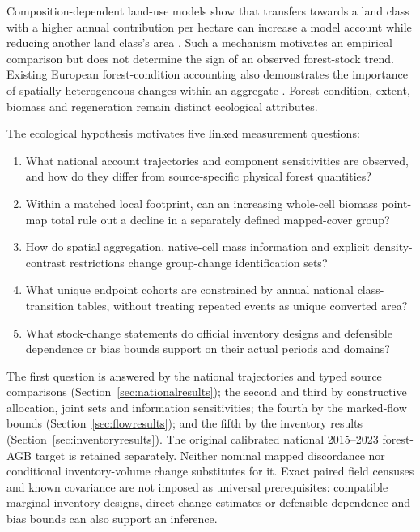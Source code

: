 \documentclass[11pt,a4paper]{article}
\begin{document}
Composition-dependent land-use models show that transfers towards a land class with a higher annual contribution per hectare can increase a model account while reducing another land class's area \citep{Abaee2026}. Such a mechanism motivates an empirical comparison but does not determine the sign of an observed forest-stock trend. Existing European forest-condition accounting also demonstrates the importance of spatially heterogeneous changes within an aggregate \citep{Maes2023}. Forest condition, extent, biomass and regeneration remain distinct ecological attributes.

The ecological hypothesis motivates five linked measurement questions:
\begin{enumerate}
\item What national account trajectories and component sensitivities are observed, and how do they differ from source-specific physical forest quantities?
\item Within a matched local footprint, can an increasing whole-cell biomass point-map total rule out a decline in a separately defined mapped-cover group?
\item How do spatial aggregation, native-cell mass information and explicit density-contrast restrictions change group-change identification sets?
\item What unique endpoint cohorts are constrained by annual national class-transition tables, without treating repeated events as unique converted area?
\item What stock-change statements do official inventory designs and defensible dependence or bias bounds support on their actual periods and domains?
\end{enumerate}
The first question is answered by the national trajectories and typed source comparisons (Section~\ref{sec:nationalresults}); the second and third by constructive allocation, joint sets and information sensitivities; the fourth by the marked-flow bounds (Section~\ref{sec:flowresults}); and the fifth by the inventory results (Section~\ref{sec:inventoryresults}). The original calibrated national 2015--2023 forest-AGB target is retained separately. Neither nominal mapped discordance nor conditional inventory-volume change substitutes for it. Exact paired field censuses and known covariance are not imposed as universal prerequisites: compatible marginal inventory designs, direct change estimates or defensible dependence and bias bounds can also support an inference.
\end{document}
